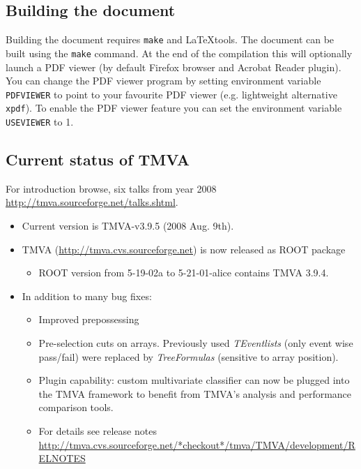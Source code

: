 \begin{appendix}
\subsection{Building the document}

Building the document requires {\tt make} and \LaTeX tools. The
document can be built using the {\tt make} command. At the end of the
compilation this will optionally launch a PDF viewer (by default Firefox browser
and Acrobat Reader plugin). You can change the PDF viewer program by
setting environment variable {\tt PDFVIEWER} to point to your
favourite PDF viewer (e.g. lightweight alternative {\tt xpdf}). To
enable the PDF viewer feature you can set the environment
variable {\tt USEVIEWER} to 1.

\subsection{Current status of TMVA}
For introduction browse, six talks from year 2008 \url{http://tmva.sourceforge.net/talks.shtml}.

\begin{itemize}
\item Current version is TMVA-v3.9.5 (2008 Aug. 9th).
\item TMVA (\url{http://tmva.cvs.sourceforge.net}) is now released as ROOT package

\begin{itemize}
\item ROOT version from 5-19-02a to 5-21-01-alice contains TMVA 3.9.4.
\end{itemize}

\item In addition to many bug fixes:
\begin{itemize}
\item Improved prepossessing
\item Pre-selection cuts on arrays. Previously used {\em TEventlists} 
(only event  wise pass/fail) were replaced by {\em TreeFormulas} (sensitive to array position).
\item Plugin capability: custom multivariate classifier can now be plugged into
    the TMVA framework to benefit from TMVA's analysis and performance comparison
    tools. 

\item For details see release notes 
\url{http://tmva.cvs.sourceforge.net/*checkout*/tmva/TMVA/development/RELNOTES}
\end{itemize}


\end{itemize}
\end{appendix}
